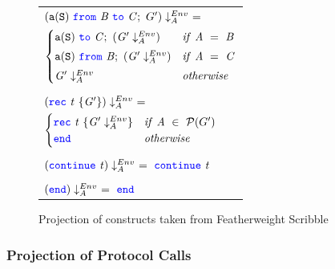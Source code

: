 \documentclass[12pt,twoside]{report}
\begin{document}
\begin{figure}[!h]
    \begin{center}
        \begin{tabular}{l}
            $(\scrmessage{a}{S}\ \from\ \mathit{B}\ \scrto\ \mathit{C};\ G') \project\ =\ $\\[3.5pt]
            \begin{math}
                \begin{cases}
                    \mathtt{a}(\mathtt{S})\ {\color{blue}\mathtt{to}}\ \mathit{C};\ (\mathit{G'} \downarrow_A^{Env}) & \mathit{if}\ \mathit{A}\ =\ \mathit{B}\\[3pt]
                    \mathtt{a}(\mathtt{S})\ {\color{blue}\mathtt{from}}\ \mathit{B};\ (\mathit{G'} \downarrow_A^{Env}) & \mathit{if}\ \mathit{A}\ =\ \mathit{C}\\[3pt]
                    \mathit{G'} \downarrow_A^{Env} & \mathit{otherwise}
                \end{cases}
            \end{math}
            \\\\
            $(\rec\ \mathit{t}\ \{\mathit{G'}\}) \project\ =$\\[3.5pt]
            \begin{math}
               \begin{cases}
                   {\color{blue}\mathtt{rec}}\ \mathit{t}\ \{\mathit{G'} \downarrow_A^{Env}\} & \mathit{if}\ \mathit{A}\ \in\ \mathcal{P}(G')\\
                   {\color{blue}\mathtt{end}} & \mathit{otherwise}
               \end{cases}
           \end{math}
           \\\\
           $(\continue\ \mathit{t}) \project\ =\ \continue\ \mathit{t}$
           \\\\
           $({\color{blue}\mathtt{end}}) \downarrow_A^{Env}\ =\ {\color{blue}\mathtt{end}}$
        \end{tabular}
    \end{center}
 
    \caption{Projection of constructs taken from Featherweight Scribble\cite{featherweight}}
    \label{featherweight-scribble-projections}
\end{figure}

\subsubsection{Projection of Protocol Calls}
\end{document}
